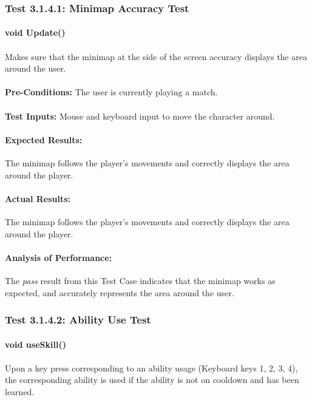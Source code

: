 \documentclass{article}
\begin{document}
    \subsubsection{Test 3.1.4.1: Minimap Accuracy Test}
    \paragraph{}\textbf{void Update()} 
    \paragraph{} Makes sure that the minimap at the side of the screen accuracy displays the area around the user.
    \paragraph{}\textbf{Pre-Conditions:} The user is currently playing a match.
    \paragraph{}\textbf{Test Inputs:} Mouse and keyboard input to move the character around.
    \paragraph{Expected Results:} The minimap follows the player's movements and correctly displays the area around the player.
    \paragraph{Actual Results:} The minimap follows the player's movements and correctly displays the area around the player.
    \paragraph{Analysis of Performance:} The \emph{pass} result from this Test Case indicates that the minimap works as expected, and accurately represents the area around the user.
    
    \subsubsection{Test 3.1.4.2: Ability Use Test}
    \paragraph{}\textbf{void useSkill()}
    \paragraph{} Upon a key press corresponding to an ability usage (Keyboard keys 1, 2, 3, 4), the corresponding ability is used if the ability is not on cooldown and has been learned.
\end{document}
